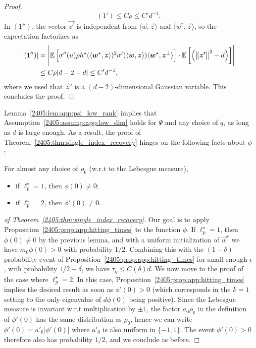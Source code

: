 \begin{proof}
  \[ (1') \leq C \rho \leq C' d^{-1}. \]
  In $(1'')$, the vector $\vec{z'}$ is independent from $\langle \vec{w}, \vec{z} \rangle$ and $\langle \vec{w}^\star, \vec{z} \rangle$, so the expectation factorizes as
  \begin{align*}
    |(1'')| &= \left|\mathbb{E}\left[\sigma''(u) \rho  h^\star(\langle {\boldsymbol{w}}^\star, {\boldsymbol{z}} \rangle)^2 \sigma'(\langle {\boldsymbol{w}}, {\boldsymbol{z}} \rangle) \langle {\boldsymbol{w}}^\star, {\boldsymbol{z}}^\bot \rangle \right]\cdot  \mathbb{E}\left[\left(\left\lVert {\boldsymbol{z'}}\right\rVert^2 - d \right) \right]\right| \\
    &\leq C \rho |d - 2 - d| \leq C' d^{-1},
  \end{align*}
  where we used that $\vec{z}'$ is a $(d-2)$-dimensional Gaussian variable. This concludes the proof.
\end{proof}

Lemma~\ref{2405:lem:app:psi_low_rank} implies that Assumption~\ref{2405:assump:app:low_dim} holds for $\Psi$ and any choice of $q$, as long as $d$ is large enough.  As a result, the proof of Theorem~\ref{2405:thm:single_index_recovery} hinges on the following facts about $\phi$:
\begin{proposition}\label{2405:prop:app:phi_phip_nnz}
  For almost any choice of $\rho_0$ (w.r.t to the Lebesgue measure),
  \begin{itemize}
    \item if $\ell_p^\star = 1$, then $\phi(0) \neq 0$;
    \item if $\ell_p^\star = 2$, then $\phi'(0) \neq 0$.
  \end{itemize}
\end{proposition}

\begin{proof}[of Theorem~\ref{2405:thm:single_index_recovery}]
    Our goal is to apply Proposition~\ref{2405:prop:app:hitting_times} to the function $\phi$. If $\ell_p^\star = 1$, then $\phi(0) \neq 0$ by the previous lemma, and with a uniform initialization of $\vec{w}^\star$ we have $m_0 \phi(0) > 0$ with probability $1/2$.  Combining this with the $(1- \delta)$ probability event of Proposition~\ref{2405:prop:app:hitting_times} for small enough $\epsilon$, with probability $1/2 - \delta$, we have $\tau_\eta \leq C(\delta) d$.
    We now move to the proof of the case where $\ell_p^\star =2$. In this case, Proposition~\ref{2405:prop:app:hitting_times} implies the desired result as soon as $\phi'(0) > 0$ (which corresponds in the $k = 1$ setting to the only eigenvalue of $d\phi(0)$ being positive). Since the Lebesgue measure is invariant w.r.t multiplication by $\pm 1$, the factor $a_0 \rho_0$ in the definition of $\phi'(0)$ has the same distribution as $\rho_0$, hence we can write $\phi'(0) = a'_0 |\phi'(0)|$ where $a'_0$ is also uniform in $\{-1, 1\}$. The event $\phi'(0) > 0$ therefore also has probability $1/2$, and we conclude as before.
\end{proof}

